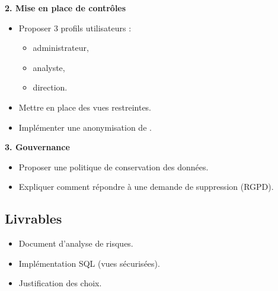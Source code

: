 \documentclass[11pt,a4paper]{article}
\begin{document}
\textbf{2. Mise en place de contrôles}

\begin{itemize}
  \item Proposer 3 profils utilisateurs :
  \begin{itemize}
    \item administrateur,
    \item analyste,
    \item direction.
  \end{itemize}
  \item Mettre en place des vues restreintes.
  \item Implémenter une anonymisation de .
\end{itemize}

\textbf{3. Gouvernance}

\begin{itemize}
  \item Proposer une politique de conservation des données.
  \item Expliquer comment répondre à une demande de suppression (RGPD).
\end{itemize}

\subsection*{Livrables}

\begin{itemize}
  \item Document d’analyse de risques.
  \item Implémentation SQL (vues sécurisées).
  \item Justification des choix.
\end{itemize}
\end{document}
